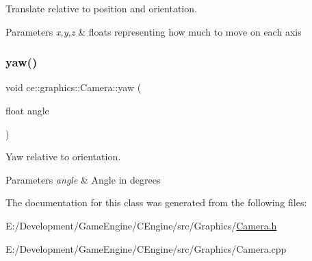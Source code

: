Translate relative to position and orientation. 


\begin{DoxyParams}{Parameters}
{\em x,y,z} & floats representing how much to move on each axis \\
\hline
\end{DoxyParams}
\mbox{\label{classce_1_1graphics_1_1_camera_ae10a5ea5d64a90f533547f1f6e8ae7ad}} 
\subsubsection{\texorpdfstring{yaw()}{yaw()}}
{\footnotesize\ttfamily void ce\+::graphics\+::\+Camera\+::yaw (\begin{DoxyParamCaption}\item[{float}]{angle }\end{DoxyParamCaption})}



Yaw relative to orientation. 


\begin{DoxyParams}{Parameters}
{\em angle} & Angle in degrees \\
\hline
\end{DoxyParams}


The documentation for this class was generated from the following files\+:\begin{DoxyCompactItemize}
\item 
E\+:/\+Development/\+Game\+Engine/\+C\+Engine/src/\+Graphics/\hyperlink{_camera_8h}{Camera.\+h}\item 
E\+:/\+Development/\+Game\+Engine/\+C\+Engine/src/\+Graphics/Camera.\+cpp\end{DoxyCompactItemize}
